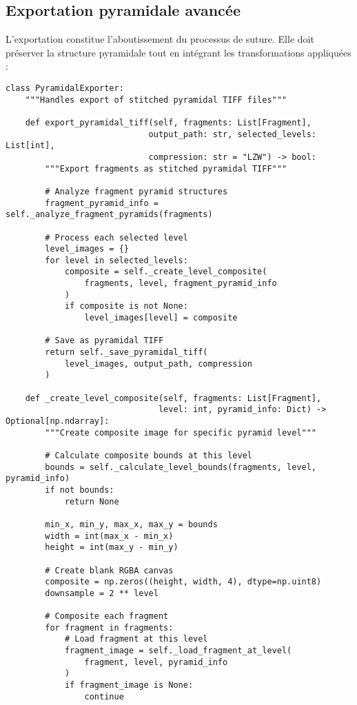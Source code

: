 \documentclass[12pt,a4paper]{report}
\begin{document}
\subsection{Exportation pyramidale avancée}

L'exportation constitue l'aboutissement du processus de suture. Elle doit préserver la structure pyramidale tout en intégrant les transformations appliquées :

\begin{lstlisting}[caption=Exportation pyramidale optimisée]
class PyramidalExporter:
    """Handles export of stitched pyramidal TIFF files"""
    
    def export_pyramidal_tiff(self, fragments: List[Fragment], 
                             output_path: str, selected_levels: List[int],
                             compression: str = "LZW") -> bool:
        """Export fragments as stitched pyramidal TIFF"""
        
        # Analyze fragment pyramid structures
        fragment_pyramid_info = self._analyze_fragment_pyramids(fragments)
        
        # Process each selected level
        level_images = {}
        for level in selected_levels:
            composite = self._create_level_composite(
                fragments, level, fragment_pyramid_info
            )
            if composite is not None:
                level_images[level] = composite
        
        # Save as pyramidal TIFF
        return self._save_pyramidal_tiff(
            level_images, output_path, compression
        )
    
    def _create_level_composite(self, fragments: List[Fragment], 
                               level: int, pyramid_info: Dict) -> Optional[np.ndarray]:
        """Create composite image for specific pyramid level"""
        
        # Calculate composite bounds at this level
        bounds = self._calculate_level_bounds(fragments, level, pyramid_info)
        if not bounds:
            return None
        
        min_x, min_y, max_x, max_y = bounds
        width = int(max_x - min_x)
        height = int(max_y - min_y)
        
        # Create blank RGBA canvas
        composite = np.zeros((height, width, 4), dtype=np.uint8)
        downsample = 2 ** level
        
        # Composite each fragment
        for fragment in fragments:
            # Load fragment at this level
            fragment_image = self._load_fragment_at_level(
                fragment, level, pyramid_info
            )
            if fragment_image is None:
                continue
            

\end{lstlisting}
\end{document}
